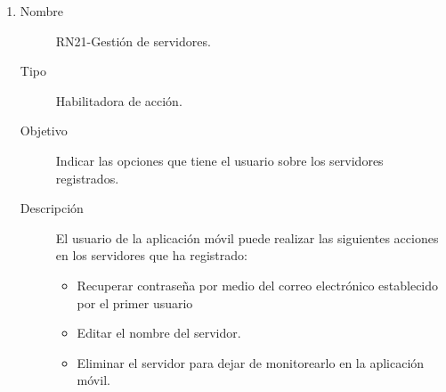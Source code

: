 \begin{enumerate}[label=RN\arabic*.]
\item \label{RN21}
		\begin{description}
			\item[Nombre] RN21-Gestión de servidores.
			\item[Tipo] Habilitadora de acción.
			\item[Objetivo] Indicar las opciones que tiene el usuario sobre los servidores registrados.
			\item[Descripción] El usuario de la aplicación móvil puede realizar las siguientes acciones en los servidores que ha registrado:
			\begin{itemize}
		 		\item Recuperar contraseña por medio del correo electrónico establecido por el primer usuario
		 		\item Editar el nombre del servidor.
		 		\item Eliminar el servidor para dejar de monitorearlo en la aplicación móvil.
		    \end{itemize}
		\end{description}
\end{enumerate}


